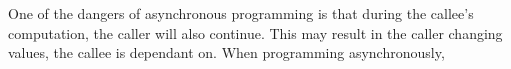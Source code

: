One of the dangers of asynchronous programming is that during the callee's computation, the caller will also continue.
This may result in the caller changing values, the callee is dependant on.
When programming asynchronously, 

